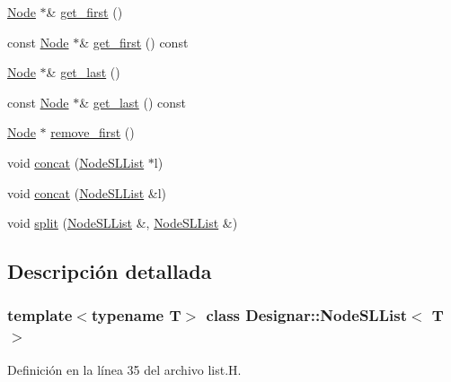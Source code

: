 \begin{DoxyCompactItemize}
\hyperlink{class_designar_1_1_node_s_l_list_a41963019ada1025099e3259207a3de96}{Node} $\ast$\& \hyperlink{class_designar_1_1_node_s_l_list_af776e7d8dba9e4a250df74b6eac36658}{get\+\_\+first} ()
\item 
const \hyperlink{class_designar_1_1_node_s_l_list_a41963019ada1025099e3259207a3de96}{Node} $\ast$\& \hyperlink{class_designar_1_1_node_s_l_list_a1644a837ab4aac745c809b021fc21dfc}{get\+\_\+first} () const
\item 
\hyperlink{class_designar_1_1_node_s_l_list_a41963019ada1025099e3259207a3de96}{Node} $\ast$\& \hyperlink{class_designar_1_1_node_s_l_list_a1c42a40b92315cd21a81c1ae74b65636}{get\+\_\+last} ()
\item 
const \hyperlink{class_designar_1_1_node_s_l_list_a41963019ada1025099e3259207a3de96}{Node} $\ast$\& \hyperlink{class_designar_1_1_node_s_l_list_acce6901e0e50d718aeff268506b6f2f1}{get\+\_\+last} () const
\item 
\hyperlink{class_designar_1_1_node_s_l_list_a41963019ada1025099e3259207a3de96}{Node} $\ast$ \hyperlink{class_designar_1_1_node_s_l_list_a37a8279d8a5dafa5239375b2a3d12b32}{remove\+\_\+first} ()
\item 
void \hyperlink{class_designar_1_1_node_s_l_list_a0400606ec383f95bf2b0e1f5c378538e}{concat} (\hyperlink{class_designar_1_1_node_s_l_list}{Node\+S\+L\+List} $\ast$l)
\item 
void \hyperlink{class_designar_1_1_node_s_l_list_af38f38977f2e947500f8e627c8888c66}{concat} (\hyperlink{class_designar_1_1_node_s_l_list}{Node\+S\+L\+List} \&l)
\item 
void \hyperlink{class_designar_1_1_node_s_l_list_a4ec48a3001dd5a0f997b09f05ed4d6e6}{split} (\hyperlink{class_designar_1_1_node_s_l_list}{Node\+S\+L\+List} \&, \hyperlink{class_designar_1_1_node_s_l_list}{Node\+S\+L\+List} \&)
\end{DoxyCompactItemize}


\subsection{Descripción detallada}
\subsubsection*{template$<$typename T$>$\newline
class Designar\+::\+Node\+S\+L\+List$<$ T $>$}



Definición en la línea 35 del archivo list.\+H.



